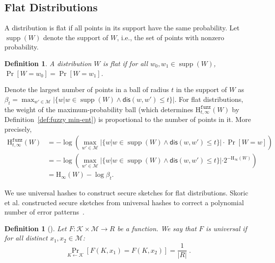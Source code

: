 \documentclass[11pt]{article}
\newcommand{\supp}{\operatorname{supp}}
\newcommand{\defref}[1]{\mbox{Definition~\ref{#1}}}
\newcommand{\dis}{\ensuremath{\mathsf{dis}}}
\newcommand{\Hoo}{\mathrm{H}_\infty}
\newcommand{\Hfuzz}{\mathrm{H}^{\mathtt{fuzz}}_{t,\infty}}
\newtheorem{definition}[theorem]{Definition}
\newcommand{\M}{\mathcal{M}}
\begin{document}

\subsection{Flat Distributions}
A distribution is flat if all points in its support have the same probability. Let $\supp(W)$ denote the support of $W$, i.e., the set of points with nonzero probability.
\begin{definition}
A distribution $W$ is \emph{flat} if for all $w_0, w_1 \in \supp(W)$,  $\Pr[W=w_0] = \Pr[W=w_1]$.  
\end{definition}

Denote the largest number of points in a ball of radius $t$ in the support of $W$ as $\beta_{t} = \max_{w'\in\M} |\{w | w\in \supp(W) \wedge \dis(w ,w')\le t\}|$.   For flat distributions, the weight of the maximum-probability ball (which determines $\Hfuzz(W)$ by \defref{def:fuzzy min-ent}) is proportional to the number of points in it.  More precisely, 
\begin{align}
\Hfuzz(W) &= -\log \left(\max_{w' \in \mathcal{M}} \left| \{w | w\in \supp(W) \wedge \dis(w, w')\le t\} \right|\cdot \Pr[W=w]\right) \nonumber \\
&= -\log\left( \max_{w' \in \mathcal{M}} |\{w | w\in \supp(W) \wedge \dis(w, w')\le t\}| \cdot 2^{-\Hoo(W)}\right) \nonumber \\
&= \Hoo(W) -\log \beta_{t}.\label{eq:fuzz for flat}
\end{align}

\noindent We use universal hashes to construct secure sketches for flat distributions.  Skoric et al. constructed secure sketches from universal hashes to correct a polynomial number of error patterns~\cite{skoric2009efficient}.


\begin{definition}[\cite{DBLP:journals/jcss/CarterW79}]
Let $F : \mathcal{K} \times \mathcal{M} \to R$ be a function.  We say that $F$ is \emph{universal} if for all distinct $x_1, x_2 \in \mathcal{M}$:
\[
 \Pr_{K \leftarrow \mathcal{K}}[F(K, x_1) = F(K, x_2)] = \frac{1}{|R|} \;.
\]
\end{definition}
\end{document}
